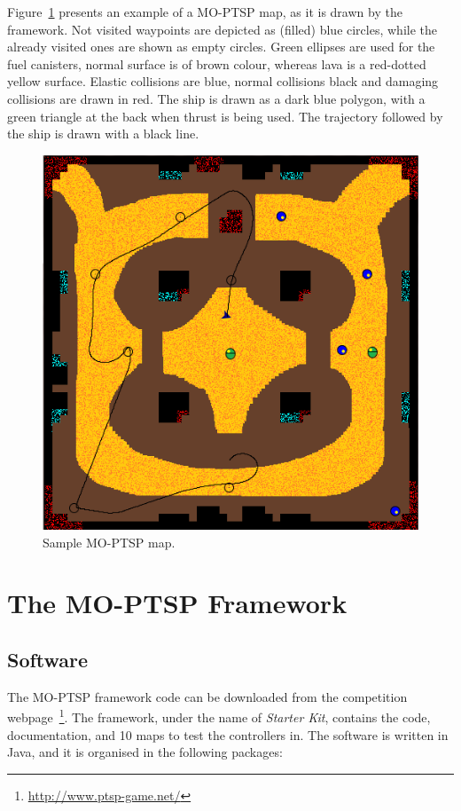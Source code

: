 \documentclass[conference]{IEEEtran}
\begin{document}
Figure~\ref{fig:sampleMap} presents an example of a MO-PTSP map, as it is drawn by the framework. Not visited waypoints are depicted as (filled) blue circles, while the already visited ones are shown as empty circles. Green ellipses are used for the fuel canisters,  normal surface is of brown colour, whereas lava is a red-dotted yellow surface. Elastic collisions are blue, normal collisions black and damaging collisions are drawn in red. The ship is drawn as a dark blue polygon, with a green triangle at the back when thrust is being used. The trajectory followed by the ship is drawn with a black line.

\begin{figure} [!h]
	\begin{center}
	\includegraphics[width=0.7\columnwidth]{img/sampleMap}
	\caption{Sample MO-PTSP map.}
	\label{fig:sampleMap}
	\end{center}
\end{figure}


\section{The MO-PTSP Framework} \label{sec:contr}


\subsection{Software} \label{ssec:software}

The MO-PTSP framework code can be downloaded from the competition webpage~\footnote{\url{http://www.ptsp-game.net/}}. The framework, under the name of \textit{Starter Kit}, contains the code, documentation, and 10 maps to test the controllers in. The software is written in Java, and it is organised in the following packages:
\end{document}
